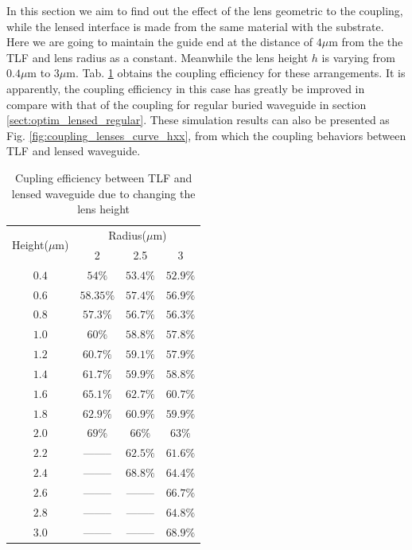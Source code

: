 In this section we aim to find out the effect of the lens geometric to the coupling, while the lensed interface is made from the same material with the substrate. Here we are going to maintain the guide end at the distance of $4\mu$m from the the TLF and lens radius as a constant. Meanwhile the lens height $h$  is varying from $0.4\mu$m to $3\mu$m. Tab. \ref{tab:coupling_lensed_waveguide_height} obtains the coupling efficiency for these arrangements. It is apparently, the coupling efficiency in this case has greatly be improved in compare with that of the coupling for regular buried waveguide in section \ref{sect:optim_lensed_regular}. These simulation results can also be presented as Fig. \ref{fig:coupling_lenses_curve_hxx}, from which the coupling behaviors between TLF and lensed waveguide.\\    
\begin{table}
\caption{Cupling efficiency between TLF and lensed waveguide due to changing the lens height}
\centering
\begin{tabular}{|c|c|c|c|}
\hline
\multirow{2}{*}{Height($\mu$m)}&\multicolumn{3}{c|}{Radius($\mu$m)}\\
\cline{2-4}
 			&	2&	2.5&	3\\
\hline
$0.4$&$54\%$&$53.4\%$&$52.9\%$\\
$0.6$&$58.35\%$&$57.4\%$&$56.9\%$\\
$0.8$&$57.3\%$&$56.7\%$&$56.3\%$\\
$1.0$&$60\%$&$58.8\%$&$57.8\%$\\
$1.2$&$60.7\%$&$59.1\%$&$57.9\%$\\
$1.4$&$61.7\%$&$59.9\%$&$58.8\%$\\
$1.6$&$65.1\%$&$62.7\%$&$60.7\%$\\
$1.8$&$62.9\%$&$60.9\%$&$59.9\%$\\
$2.0$&$69\%$  &  $66\%$&$63\%$\\
$2.2$&--------&$62.5\%$&$61.6\%$\\
$2.4$&--------&$68.8\%$&$64.4\%$\\
$2.6$&--------&--------&$66.7\%$\\
$2.8$&--------&--------&$64.8\%$\\
$3.0$&--------&--------&$68.9\%$\\
\hline
\end{tabular}
\label{tab:coupling_lensed_waveguide_height}
\end{table}
